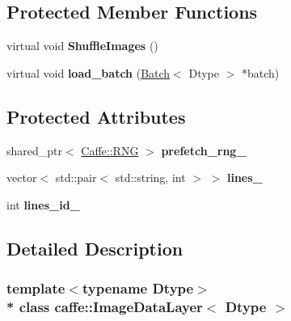 \subsection*{Protected Member Functions}
\begin{DoxyCompactItemize}
\item 
virtual void {\bfseries Shuffle\+Images} ()\hypertarget{classcaffe_1_1ImageDataLayer_a1726e1385072928d37d960c52f0d20b4}{}\label{classcaffe_1_1ImageDataLayer_a1726e1385072928d37d960c52f0d20b4}

\item 
virtual void {\bfseries load\+\_\+batch} (\hyperlink{classcaffe_1_1Batch}{Batch}$<$ Dtype $>$ $\ast$batch)\hypertarget{classcaffe_1_1ImageDataLayer_ae75501864cc0d1e18d8d05b1f601fc89}{}\label{classcaffe_1_1ImageDataLayer_ae75501864cc0d1e18d8d05b1f601fc89}

\end{DoxyCompactItemize}
\subsection*{Protected Attributes}
\begin{DoxyCompactItemize}
\item 
shared\+\_\+ptr$<$ \hyperlink{classcaffe_1_1Caffe_1_1RNG}{Caffe\+::\+R\+NG} $>$ {\bfseries prefetch\+\_\+rng\+\_\+}\hypertarget{classcaffe_1_1ImageDataLayer_a57a7df530e562fa080923aab6c331ab9}{}\label{classcaffe_1_1ImageDataLayer_a57a7df530e562fa080923aab6c331ab9}

\item 
vector$<$ std\+::pair$<$ std\+::string, int $>$ $>$ {\bfseries lines\+\_\+}\hypertarget{classcaffe_1_1ImageDataLayer_a72002dc4459f0d7d739779d734a7c684}{}\label{classcaffe_1_1ImageDataLayer_a72002dc4459f0d7d739779d734a7c684}

\item 
int {\bfseries lines\+\_\+id\+\_\+}\hypertarget{classcaffe_1_1ImageDataLayer_a943f32fdd8d0d37883500b6d83d4243f}{}\label{classcaffe_1_1ImageDataLayer_a943f32fdd8d0d37883500b6d83d4243f}

\end{DoxyCompactItemize}


\subsection{Detailed Description}
\subsubsection*{template$<$typename Dtype$>$\\*
class caffe\+::\+Image\+Data\+Layer$<$ Dtype $>$}

